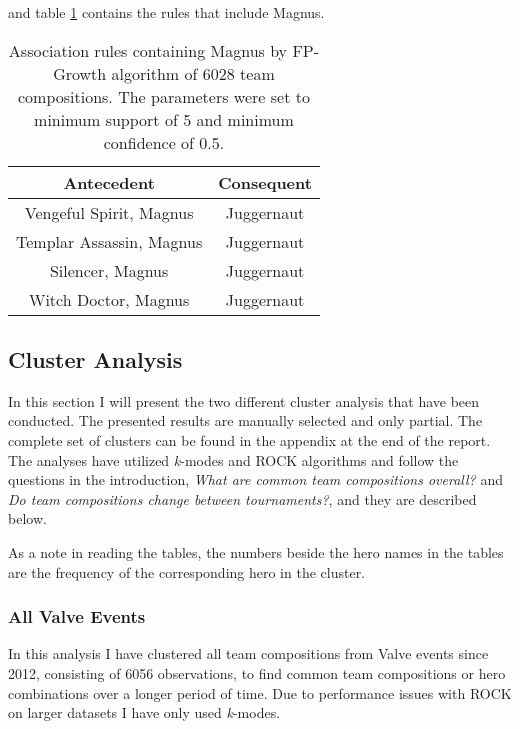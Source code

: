\documentclass[result.tex]{subfiles}
\begin{document}
and table \ref{tab:ass_magnus} contains the rules that include Magnus.

\begin{table}[H]
  \centering
  \begin{tabular}{ | c | c | }
    \hline
    Antecedent & Consequent \\ \hline
    Vengeful Spirit, Magnus & Juggernaut \\ \hline
    Templar Assassin, Magnus & Juggernaut \\ \hline
    Silencer, Magnus & Juggernaut \\ \hline
    Witch Doctor, Magnus & Juggernaut  \\
    \hline
  \end{tabular}
  \caption{Association rules containing Magnus by FP-Growth algorithm of 6028 team compositions. The parameters were set to minimum support of 5 and minimum confidence of 0.5.}
  \label{tab:ass_magnus}
\end{table}

\subsection*{Cluster Analysis}

In this section I will present the two different cluster analysis that have been conducted. The presented results are manually selected and only partial. The complete set of clusters can be found in the appendix at the end of the report. The analyses have utilized \textit{k}-modes and ROCK algorithms and follow the questions in the introduction, \textit{What are common team compositions overall?} and \textit{Do team compositions change between tournaments?}, and they are described below.

As a note in reading the tables, the numbers beside the hero names in the tables are the frequency of the corresponding hero in the cluster.

\subsubsection*{All Valve Events}

In this analysis I have clustered all team compositions from Valve events since 2012, consisting of 6056 observations, to find common team compositions or hero combinations over a longer period of time. Due to performance issues with ROCK on larger datasets I have only used \textit{k}-modes.
\end{document}
